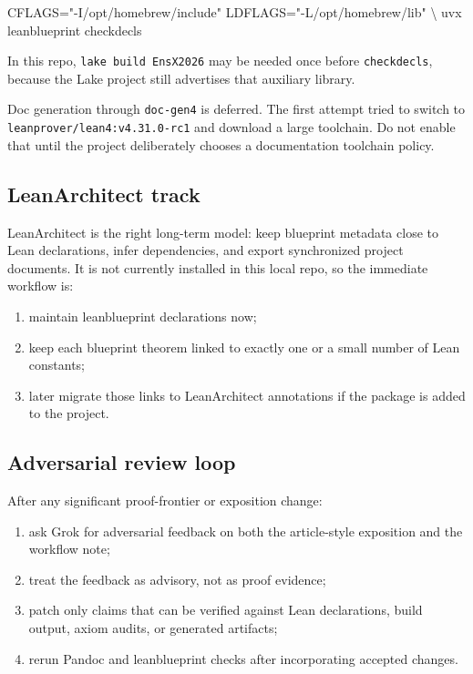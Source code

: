 \documentclass[
]{article}
\newenvironment{Shaded}{}{}
\newcommand{\NormalTok}[1]{#1}
\providecommand{\tightlist}{%
  \setlength{\itemsep}{0pt}\setlength{\parskip}{0pt}}
\begin{document}
\begin{Shaded}
\begin{Highlighting}[]
\NormalTok{CFLAGS="{-}I/opt/homebrew/include" LDFLAGS="{-}L/opt/homebrew/lib" \textbackslash{}}
\NormalTok{  uvx leanblueprint checkdecls}
\end{Highlighting}
\end{Shaded}

In this repo, \texttt{lake\ build\ EnsX2026} may be needed once before
\texttt{checkdecls}, because the Lake project still advertises that
auxiliary library.

Doc generation through \texttt{doc-gen4} is deferred. The first attempt
tried to switch to \texttt{leanprover/lean4:v4.31.0-rc1} and download a
large toolchain. Do not enable that until the project deliberately
chooses a documentation toolchain policy.

\subsection{LeanArchitect track}\label{leanarchitect-track}

LeanArchitect is the right long-term model: keep blueprint metadata
close to Lean declarations, infer dependencies, and export synchronized
project documents. It is not currently installed in this local repo, so
the immediate workflow is:

\begin{enumerate}
\def\labelenumi{\arabic{enumi}.}
\tightlist
\item
  maintain leanblueprint declarations now;
\item
  keep each blueprint theorem linked to exactly one or a small number of
  Lean constants;
\item
  later migrate those links to LeanArchitect annotations if the package
  is added to the project.
\end{enumerate}

\subsection{Adversarial review loop}\label{adversarial-review-loop}

After any significant proof-frontier or exposition change:

\begin{enumerate}
\def\labelenumi{\arabic{enumi}.}
\tightlist
\item
  ask Grok for adversarial feedback on both the article-style exposition
  and the workflow note;
\item
  treat the feedback as advisory, not as proof evidence;
\item
  patch only claims that can be verified against Lean declarations,
  build output, axiom audits, or generated artifacts;
\item
  rerun Pandoc and leanblueprint checks after incorporating accepted
  changes.
\end{enumerate}
\end{document}
